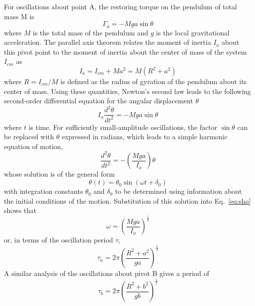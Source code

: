 \documentclass{revtex4}
\begin{document}
For oscillations about point A, the restoring torque on the pendulum of total
mass M is
\begin{equation}
\Gamma_a = -Mga \sin{\theta}
\end{equation}
where $M$ is the total mass of the pendulum and $g$ is the local gravitational
acceleration.  The parallel axis theorem relates the moment of inertia $I_a$
about this pivot point to the moment of inertia about the center of mass of
the system $I_{cm}$ as
\begin{equation}
I_a = I_{cm} + Ma^2 = M(R^2 + a^2)
\end{equation}
where $R = I_{cm}/M$ is defined as the radius of gyration of the pendulum about
its center of mass. Using these quantities, Newton's second law leads to the
following second-order differential equation for the angular displacement
$\theta$
\begin{equation}
I_a\frac{d^2\theta}{dt^2} = -Mga\sin{\theta} 
\end{equation}
where $t$ is time.  For sufficiently small-amplitude oscillations, the factor
$\sin{\theta}$ can be replaced with $\theta$ expressed in radians, which leads
to a simple harmonic equation of motion,
\begin{equation}
\frac{d^2\theta}{dt^2} = -\left(\frac{Mga}{I_a}\right)\theta \label{eq:sho} 
\end{equation}
whose solution is of the general form
\begin{equation}
\theta(t) = \theta_0\sin(\omega t+\delta_0) 
\end{equation}
with integration constants $\theta_0$ and $\delta_0$ to be determined using
information about the initial conditions of the motion.  Substitution of this
solution into Eq.~\eqref{eq:sho} shows that
\begin{equation}
\omega = \left(\frac{Mga}{I_a}\right)^{\frac{1}{2}} 
\end{equation}
or, in terms of the oscillation period $\tau$,
\begin{equation}
\tau_a = 2\pi\left(\frac{R^2+a^2}{ga}\right)^{\frac{1}{2}}
\label{eq:taua} 
\end{equation}
A similar analysis of the oscillations about pivot B gives a period of
\begin{equation}
\tau_b = 2\pi\left(\frac{R^2+b^2}{gb}\right)^{\frac{1}{2}}
\label{eq:taub} 
\end{equation}
\end{document}
